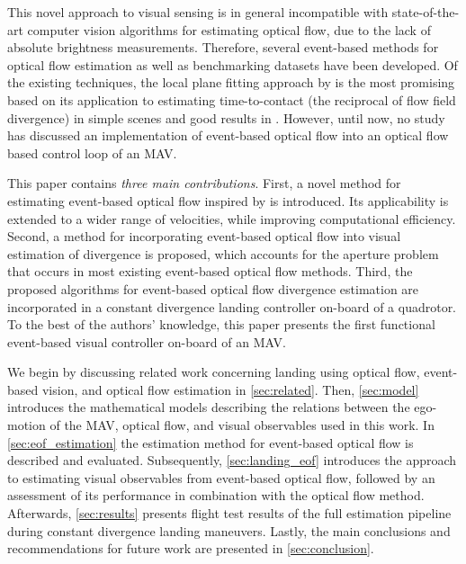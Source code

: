 This novel approach to visual sensing is in general incompatible with state-of-the-art computer vision algorithms for estimating optical flow, due to the lack of absolute brightness measurements. Therefore, several event-based methods for optical flow estimation \cite{Benosman2012,Benosman2014, Barranco2014, Brosch2015, Bardow2016} as well as benchmarking datasets \cite{Barranco2016, Ruckauer2016} have been developed. Of the existing techniques, the local plane fitting approach by \citet{Benosman2014} is the most promising based on its application to estimating time-to-contact (the reciprocal of flow field divergence) in simple scenes \cite{Clady2014} and good results in \citet{Ruckauer2016}. However, until now, no study has discussed an implementation of event-based optical flow into an optical flow based control loop of an MAV. 

This paper contains \emph{three main contributions}. First, a novel method for estimating event-based optical flow inspired by \citet{Benosman2014} is introduced. Its applicability is extended to a wider range of velocities, while improving computational efficiency. Second, a method for incorporating event-based optical flow into visual estimation of divergence is proposed, which accounts for the aperture problem that occurs in most existing event-based optical flow methods. Third, the proposed algorithms for event-based optical flow divergence estimation are incorporated in a constant divergence landing controller on-board of a quadrotor. To the best of the authors' knowledge, this paper presents the first functional event-based visual controller on-board of an MAV.
 
We begin by discussing related work concerning landing using optical flow, event-based vision, and optical flow estimation in \cref{sec:related}. Then, \cref{sec:model} introduces the mathematical models describing the relations between the ego-motion of the MAV, optical flow, and visual observables used in this work. In \cref{sec:eof_estimation} the estimation method for event-based optical flow is described and evaluated. Subsequently, \cref{sec:landing_eof} introduces the approach to estimating visual observables from event-based optical flow, followed by an assessment of its performance in combination with the optical flow method. Afterwards, \cref{sec:results} presents flight test results of the full estimation pipeline during constant divergence landing maneuvers. Lastly, the main conclusions and recommendations for future work are presented in \cref{sec:conclusion}.

